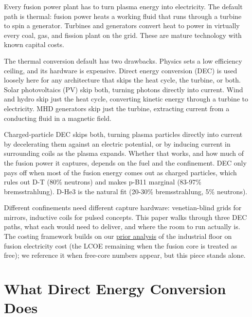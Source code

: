 \documentclass{article}
\begin{document}

Every fusion power plant has to turn plasma energy into electricity. The
default path is thermal: fusion power heats a working fluid that runs
through a turbine to spin a generator. Turbines and generators convert
heat to power in virtually every coal, gas, and fission plant on the
grid. These are mature technology with known capital costs.

The thermal conversion default has two drawbacks. Physics sets a low
efficiency ceiling, and its hardware is expensive. Direct energy
conversion (DEC) is used loosely here for any architecture that skips
the heat cycle, the turbine, or both. Solar photovoltaics (PV) skip
both, turning photons directly into current. Wind and hydro skip just
the heat cycle, converting kinetic energy through a turbine to
electricity. MHD generators skip just the turbine, extracting current
from a conducting fluid in a magnetic field.

Charged-particle DEC skips both, turning plasma particles directly into
current by decelerating them against an electric potential, or by
inducing current in surrounding coils as the plasma expands. Whether
that works, and how much of the fusion power it captures, depends on the
fuel and the confinement. DEC only pays off when most of the fusion
energy comes out as charged particles, which rules out D-T (80\%
neutrons) and makes p-B11 marginal (83-97\% bremsstrahlung). D-He3 is
the natural fit (20-30\% bremsstrahlung, 5\% neutrons).

Different confinements need different capture hardware: venetian-blind
grids for mirrors, inductive coils for pulsed concepts. This paper walks
through three DEC paths, what each would need to deliver, and where the
room to run actually is. The costing framework builds on our
\href{https://1cf.energy/fusions-cost-floor-what-if-the-core-were-free/}{prior
analysis} of the industrial floor on fusion electricity cost (the LCOE
remaining when the fusion core is treated as free); we reference it when
free-core numbers appear, but this piece stands alone.

\section{What Direct Energy Conversion Does}\label{what-direct-energy-conversion-does}
\end{document}
